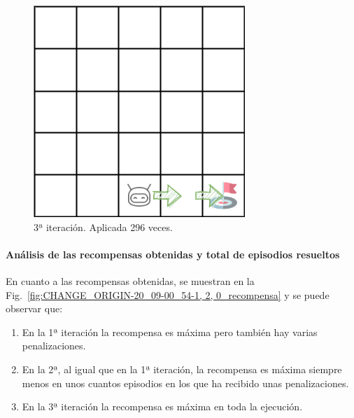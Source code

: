 \begin{figure}
    \centering
    \includegraphics[scale=0.4]{cap5_experimentacion/images/dim5_CHANGE_ORIGIN-20-09_00-42-50.png}
    \caption{3ª iteración. Aplicada 296 veces.}
    \label{fig:dim5_CHANGE_ORIGIN-20_09-00_52-1, 2, 0_3iter}
\end{figure}

\paragraph{Análisis de las recompensas obtenidas y total de episodios resueltos} 

En cuanto a las recompensas obtenidas, se muestran en la Fig.~\ref{fig:CHANGE_ORIGIN-20_09-00_54-1, 2, 0_recompensa} y se puede observar que: 
\begin{enumerate}
    \item En la 1ª iteración la recompensa es máxima pero también hay varias penalizaciones. 
    \item En la 2ª, al igual que en la 1ª iteración, la recompensa es máxima siempre menos en unos cuantos episodios en los que ha recibido unas penalizaciones. 
    \item En la 3ª iteración la recompensa es máxima en toda la ejecución. 
\end{enumerate}

